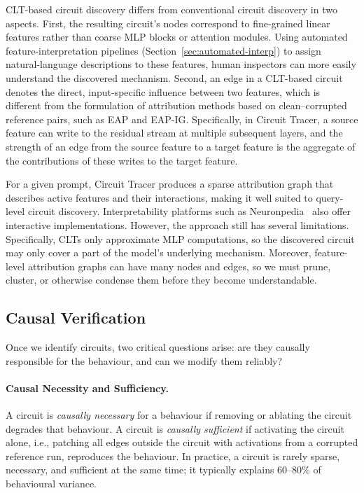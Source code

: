 CLT-based circuit discovery differs from conventional circuit discovery in two aspects. First, the resulting circuit's nodes correspond to fine-grained linear features rather than coarse MLP blocks or attention modules. Using automated feature-interpretation pipelines (Section~\ref{sec:automated-interp}) to assign natural-language descriptions to these features, human inspectors can more easily understand the discovered mechanism. Second, an edge in a CLT-based circuit denotes the direct, input-specific influence between two features, which is different from the formulation of attribution methods based on clean--corrupted reference pairs, such as EAP and EAP-IG. Specifically, in Circuit Tracer, a source feature can write to the residual stream at multiple subsequent layers, and the strength of an edge from the source feature to a target feature is the aggregate of the contributions of these writes to the target feature.

For a given prompt, Circuit Tracer produces a sparse attribution graph that describes active features and their interactions, making it well suited to query-level circuit discovery. Interpretability platforms such as Neuronpedia~ also offer interactive implementations. However, the approach still has several limitations. Specifically, CLTs only approximate MLP computations, so the discovered circuit may only cover a part of the model's underlying mechanism. Moreover, feature-level attribution graphs can have many nodes and edges, so we must prune, cluster, or otherwise condense them before they become understandable.

\subsection{Causal Verification}
\label{sec:causal-verification}

Once we identify circuits, two critical questions arise: are they causally responsible for the behaviour, and can we modify them reliably?

\paragraph{Causal Necessity and Sufficiency.}
A circuit is \emph{causally necessary} for a behaviour if removing or ablating the circuit degrades that behaviour. A circuit is \emph{causally sufficient} if activating the circuit alone, i.e., patching all edges outside the circuit with activations from a corrupted reference run, reproduces the behaviour. In practice, a circuit is rarely sparse, necessary, and sufficient at the same time; it typically explains 60--80\% of behavioural variance.

